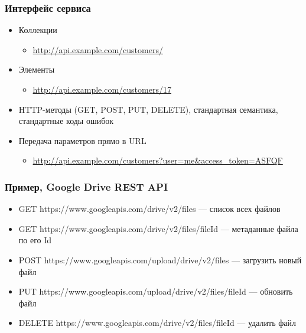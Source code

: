 \documentclass{../cscslides}
\begin{document}
    \begin{frame}
        \frametitle{Интерфейс сервиса}
        \begin{itemize}
            \item Коллекции
            \begin{itemize}
                \item \url{http://api.example.com/customers/}
            \end{itemize}
            \item Элементы
            \begin{itemize}
                \item \url{http://api.example.com/customers/17}
            \end{itemize}
            \item HTTP-методы (GET, POST, PUT, DELETE), стандартная семантика, стандартные коды ошибок
            \item Передача параметров прямо в URL
            \begin{itemize}
                \item \url{http://api.example.com/customers?user=me&access_token=ASFQF}
            \end{itemize}
        \end{itemize}
    \end{frame}

    \begin{frame}
        \frametitle{Пример, Google Drive REST API}
        \begin{itemize}
            \item GET https://www.googleapis.com/drive/v2/files --- список всех файлов
            \item GET https://www.googleapis.com/drive/v2/files/fileId --- метаданные файла по его Id
            \item POST https://www.googleapis.com/upload/drive/v2/files — загрузить новый файл
            \item PUT https://www.googleapis.com/upload/drive/v2/files/fileId --- обновить файл
            \item DELETE https://www.googleapis.com/drive/v2/files/fileId --- удалить файл
        \end{itemize}
    \end{frame}
\end{document}
